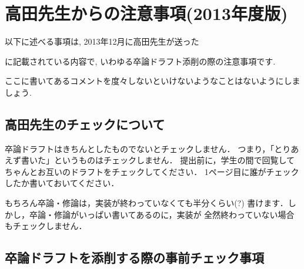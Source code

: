 \chapter{高田先生からの注意事項(2013年度版)}
以下に述べる事項は, 2013年12月に高田先生が送った
\begin{center}
\end{center}
に記載されている内容で, いわゆる卒論ドラフト添削の際の注意事項です.

ここに書いてあるコメントを度々しないといけないようなことはないようにしましょう.

\section{高田先生のチェックについて}
卒論ドラフトはきちんとしたものでないとチェックしません．
つまり，「とりあえず書いた」というものはチェックしません．
提出前に，学生の間で回覧してちゃんとお互いのドラフトをチェックしてください．
1ページ目に誰がチェックしたか書いておいてください．
\begin{center}
\end{center}

もちろん卒論・修論は，実装が終わっていなくても半分くらい(?)
書けます．しかし，卒論・修論がいっぱい書いてあるのに，実装が
全然終わっていない場合もチェックしません．

\section{卒論ドラフトを添削する際の事前チェック事項}

